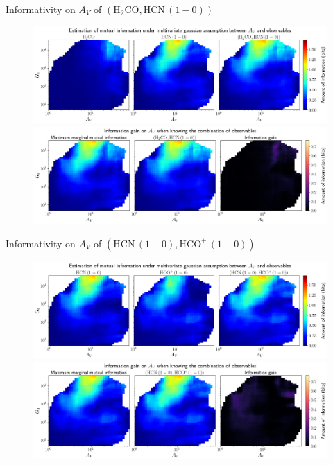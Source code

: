 \documentclass{beamer}
\begin{document}
\begin{frame}{Informativity on $A_V$ of $\left(\mathrm{H_2CO},\mathrm{HCN\,(1-0)}\right)$}
    \begin{figure}
        \centering
        \includegraphics[width=0.95\linewidth]{../linearinfogauss/av__h2co_hcn10_linearinfogauss.png}
        \vfill
        \includegraphics[width=0.95\linewidth]{../linearinfogauss/av__h2co_hcn10_linearinfogauss_gain.png}
    \end{figure}
\end{frame}

\begin{frame}{Informativity on $A_V$ of $\left(\mathrm{HCN\,(1-0)},\mathrm{HCO^+\,(1-0)}\right)$}
    \begin{figure}
        \centering
        \includegraphics[width=0.95\linewidth]{../linearinfogauss/av__hcn10_hcop10_linearinfogauss.png}
        \vfill
        \includegraphics[width=0.95\linewidth]{../linearinfogauss/av__hcn10_hcop10_linearinfogauss_gain.png}
    \end{figure}
\end{frame}
\end{document}

